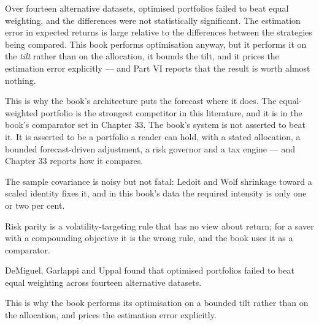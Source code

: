 \begin{takeaway}
Over fourteen alternative datasets, optimised portfolios failed to beat
equal weighting, and the differences were not statistically significant.
The estimation error in expected returns is large relative to the
differences between the strategies being compared. This book performs
optimisation anyway, but it performs it on the \emph{tilt} rather than on
the allocation, it bounds the tilt, and it prices the estimation error
explicitly --- and Part VI reports that the result is worth almost
nothing.
\end{takeaway}

This is why the book's architecture puts the forecast where it does. The
equal-weighted portfolio is the strongest competitor in this literature,
and it is in the book's comparator set in Chapter 33. The book's system is
not asserted to beat it. It is asserted to be a portfolio a reader can
hold, with a stated allocation, a bounded forecast-driven adjustment, a
risk governor and a tax engine --- and Chapter 33 reports how it compares.

\begin{keytakeaways}
\item The sample covariance is noisy but not fatal: Ledoit and Wolf
shrinkage toward a scaled identity fixes it, and in this book's data the
required intensity is only one or two per cent.
\item Risk parity is a volatility-targeting rule that has no view about
return; for a saver with a compounding objective it is the wrong rule,
and the book uses it as a comparator.
\item DeMiguel, Garlappi and Uppal found that optimised portfolios failed
to beat equal weighting across fourteen alternative datasets.
\item This is why the book performs its optimisation on a bounded tilt
rather than on the allocation, and prices the estimation error explicitly.
\end{keytakeaways}
